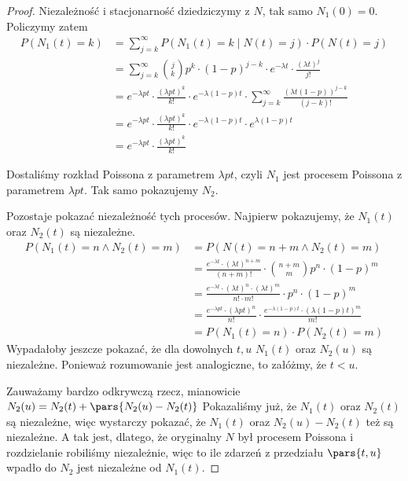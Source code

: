 \begin{proof}
	Niezależność i stacjonarność dziedziczymy z \( N \), tak samo \( N_1(0) = 0 \).
	Policzymy zatem
	\begin{align*}
		P(N_1(t) = k)
		 & = \sum_{j=k}^\infty P(N_1(t) = k \mid N(t) = j) \cdot P(N(t) = j)                                             \\
		 & = \sum_{j=k}^\infty \binom{j}{k} p^k \cdot (1-p)^{j-k} \cdot e^{-\lambda t} \cdot \frac{(\lambda t)^j}{j!}    \\
		 & = e^{-\lambda p t} \cdot \frac{(\lambda p t)^k}{k!} \cdot e^{-\lambda (1 - p) t} \cdot
		\sum_{j=k}^\infty \frac{(\lambda t (1 - p))^{j-k}}{(j-k)!}                                                       \\
		 & = e^{-\lambda p t} \cdot \frac{(\lambda p t)^k}{k!} \cdot e^{-\lambda (1 - p) t}  \cdot e^{\lambda (1 - p) t} \\
		 & = e^{-\lambda p t} \cdot \frac{(\lambda p t)^k}{k!}
	\end{align*}

	Dostaliśmy rozkład Poissona z parametrem \( \lambda p t \), czyli \( N_1 \) jest procesem Poissona z parametrem \( \lambda p t \). Tak samo pokazujemy \( N_2 \).

	Pozostaje pokazać niezależność tych procesów.
	Najpierw pokazujemy, że \( N_1(t) \) oraz \( N_2(t) \) są niezależne.
	\begin{align*}
		P(N_1(t) = n \land N_2(t) = m)
		 & = P(N(t) = n + m \land N_2(t) = m)                                                                                  \\
		 & = \frac{e^{-\lambda t}\cdot(\lambda t)^{n + m}}{(n + m)!} \cdot \binom{n + m}{m} p^n \cdot (1-p)^m                  \\
		 & = \frac{e^{-\lambda t}\cdot(\lambda t)^n \cdot (\lambda t)^m}{n! \cdot m!} \cdot p^n \cdot (1-p)^m                  \\
		 & = \frac{e^{-\lambda p t} \cdot (\lambda p t)^n}{n!} \cdot \frac{e^{-\lambda (1-p) t} \cdot (\lambda (1-p) t)^m}{m!} \\
		 & = P(N_1(t) = n) \cdot P(N_2(t) = m)
	\end{align*}
	Wypadałoby jeszcze pokazać, że dla dowolnych \(t, u\) \( N_1(t) \) oraz \( N_2(u) \) są niezależne.
	Ponieważ rozumowanie jest analogiczne, to załóżmy, że \( t < u \).

	Zauważamy bardzo odkrywczą rzecz, mianowicie \( N_2(u) = N_2(t) + \pars{N_2(u) - N_2(t)} \)
	Pokazaliśmy już, że \( N_1(t) \) oraz \( N_2(t) \) są niezależne, więc wystarczy pokazać, że
	\( N_1(t) \) oraz \(N_2(u) - N_2(t)\) też są niezależne.
	A tak jest, dlatego, że oryginalny \( N \) był procesem Poissona i rozdzielanie robiliśmy niezależnie, więc to ile zdarzeń z przedziału \( \pars{t, u} \) wpadło do \( N_2 \) jest niezależne od \( N_1(t) \).
\end{proof}
